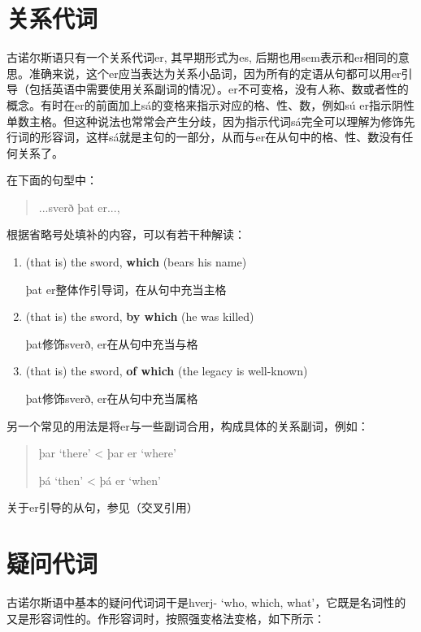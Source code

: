 \begin{introduction}[章节要点]
\section{关系代词}\label{关系代词}

古诺尔斯语只有一个关系代词er, 其早期形式为es, 后期也用sem表示和er相同的意思。准确来说，这个er应当表达为关系小品词，因为所有的定语从句都可以用er引导（包括英语中需要使用关系副词的情况）。er不可变格，没有人称、数或者性的概念。有时在er的前面加上sá的变格来指示对应的格、性、数，例如sú er指示阴性单数主格。但这种说法也常常会产生分歧，因为指示代词sá完全可以理解为修饰先行词的形容词，这样sá就是主句的一部分，从而与er在从句中的格、性、数没有任何关系了。

在下面的句型中：
\begin{quote}
    ...sverð þat er...,
\end{quote}
根据省略号处填补的内容，可以有若干种解读：
\begin{enumerate}
    \item (that is) the sword, \textbf{which} (bears his name)‌

          þat er整体作引导词，在从句中充当主格

    \item (that is) the sword, \textbf{by which} (he was killed)‌

          þat修饰sverð, er在从句中充当与格

    \item (that is) the sword, \textbf{of which} (the legacy is well-known)‌

          þat修饰sverð, er在从句中充当属格
\end{enumerate}

另一个常见的用法是将er与一些副词合用，构成具体的关系副词，例如：

\begin{quote}
    þar `there‌' < þar er `where‌'

    þá `then‌' < þá er `when‌'
\end{quote}

关于er引导的从句，参见（交叉引用）

\section{疑问代词}\label{疑问代词}

古诺尔斯语中基本的疑问代词词干是hverj- `who, which, what‌'，它既是名词性的又是形容词性的。作形容词时，按照强变格法变格，如下所示：


\end{introduction}
